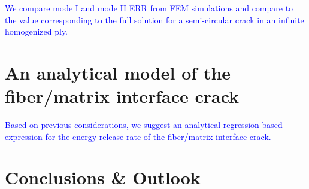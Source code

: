 \documentclass[review]{elsarticle}
\begin{document}
\textcolor{blue}{We compare mode I and mode II ERR from FEM simulations and compare to the value corresponding to the full solution for a semi-circular crack in an infinite homogenized ply.}

\section{An analytical model of the fiber/matrix interface crack}

\textcolor{blue}{Based on previous considerations, we suggest an analytical regression-based expression for the energy release rate of the fiber/matrix interface crack.}

\section{Conclusions \& Outlook}
\end{document}
